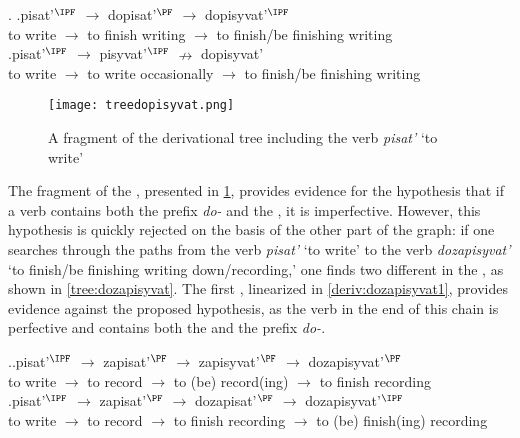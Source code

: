 \ex.\label{deriv1} \ag.\label{deriv1-1}pisat'$^\IPF$ $\rightarrow$ dopisat'$^\PF$ $\rightarrow$ dopisyvat'$^\IPF$\\
{to write} $\rightarrow$ {to finish writing} $\rightarrow$ {to finish/be finishing writing}\\
\bg.\label{deriv1-2}pisat'$^\IPF$ $\rightarrow$ pisyvat'$^\IPF$ $\nrightarrow$ dopisyvat'\\
{to write} $\rightarrow$ {to write occasionally} $\rightarrow$ {to finish/be finishing writing}\\

\begin{figure}
\begin{center}
\texttt{[image: treedopisyvat.png]}
\caption{A fragment of the derivational tree including the verb \textit{pisat'} `to write'\label{tree:dopisyvat}}
\end{center}
\end{figure}

The fragment of the , presented in \ref{tree:dopisyvat}, provides evidence for the hypothesis that if a verb contains both the prefix \textit{do-} and the , it is imperfective. However, this hypothesis is quickly rejected on the basis of the other part of the graph: if one searches through the paths from the verb {\it pisat'} `to write' to the verb {\it dozapisyvat'} `to finish/be finishing writing down/recording,' one finds two different  in the , as shown in \ref{tree:dozapisyvat}. The first , linearized in \ref{deriv:dozapisyvat1}, provides evidence against the proposed hypothesis, as the verb in the end of this chain is perfective and contains both the  and the prefix \textit{do-}. 

\ex.\label{deriv:dozapisyvat}\ag.\label{deriv:dozapisyvat1}pisat'$^\IPF$ $\rightarrow$ zapisat'$^\PF$ $\rightarrow$ zapisyvat'$^\PF$ $\rightarrow$ dozapisyvat'$^\PF$\\
{to write} $\rightarrow$ {to record} $\rightarrow$ {to (be) record(ing)} $\rightarrow$ {to finish recording}\\
\bg.\label{deriv:dozapisyvat2}pisat'$^\IPF$ $\rightarrow$ zapisat'$^\PF$ $\rightarrow$ dozapisat'$^\PF$ $\rightarrow$ dozapisyvat'$^\IPF$\\
{to write} $\rightarrow$ {to record} $\rightarrow$ {to finish recording} $\rightarrow$ {to (be) finish(ing) recording}\\				

